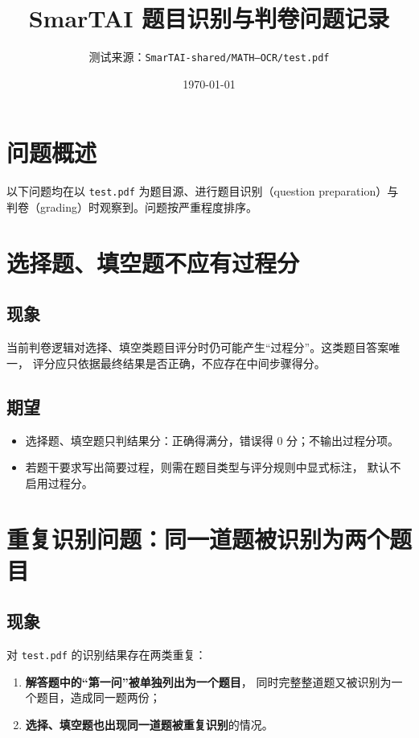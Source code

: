 \documentclass[12pt,a4paper]{ctexart}
\title{\bfseries SmarTAI 题目识别与判卷问题记录}
\author{测试来源：\texttt{SmarTAI-shared/MATH--OCR/test.pdf}}
\date{\today}
\begin{document}
\maketitle

\section*{问题概述}

以下问题均在以 \texttt{test.pdf} 为题目源、进行题目识别（question preparation）与
判卷（grading）时观察到。问题按严重程度排序。

\section{选择题、填空题不应有过程分}

\subsection{现象}
当前判卷逻辑对选择、填空类题目评分时仍可能产生“过程分”。这类题目答案唯一，
评分应只依据最终结果是否正确，不应存在中间步骤得分。

\subsection{期望}
\begin{itemize}[leftmargin=2em]
  \item 选择题、填空题只判结果分：正确得满分，错误得 0 分；不输出过程分项。
  \item 若题干要求写出简要过程，则需在题目类型与评分规则中显式标注，
        默认不启用过程分。
\end{itemize}

\section{重复识别问题：同一道题被识别为两个题目}

\subsection{现象}
对 \texttt{test.pdf} 的识别结果存在两类重复：

\begin{enumerate}[leftmargin=2em,label=(\arabic*)]
  \item \textbf{解答题中的“第一问”被单独列出为一个题目}，
        同时完整整道题又被识别为一个题目，造成同一题两份；
  \item \textbf{选择、填空题也出现同一道题被重复识别}的情况。
\end{enumerate}
\end{document}
